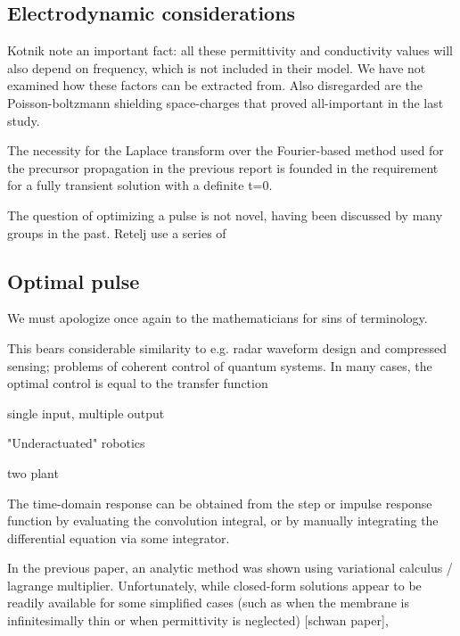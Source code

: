 \documentclass[fleqn,10pt]{paper}
\begin{document}

\subsection*{Electrodynamic considerations}

Kotnik note an important fact: all these permittivity and conductivity values will also depend on frequency, which is not included in their model. We have not examined how these factors can be extracted from. Also disregarded are the Poisson-boltzmann shielding space-charges that proved all-important in the last study. 

The necessity for the Laplace transform over the Fourier-based method used for the precursor propagation in the previous report is founded in the requirement for a fully transient solution with a definite t=0.

The question of optimizing a pulse is not novel, having been discussed by many groups in the past. Retelj use a series of 

\subsection*{Optimal pulse}

We must apologize once again to the mathematicians for sins of terminology.



This bears considerable similarity to e.g. radar waveform design and compressed sensing; problems of coherent control of quantum systems. In many cases, the optimal control is equal to the transfer function


single input, multiple output 

"Underactuated" robotics

two plant

The time-domain response can be obtained from the step or impulse response function by evaluating the convolution integral, or by manually integrating the differential equation via some integrator.

In the previous paper, an analytic method was shown using variational calculus / lagrange multiplier. Unfortunately, while closed-form solutions appear to be readily available for some simplified cases (such as when the membrane is infinitesimally thin or when permittivity is neglected) [schwan paper], 
\end{document}
